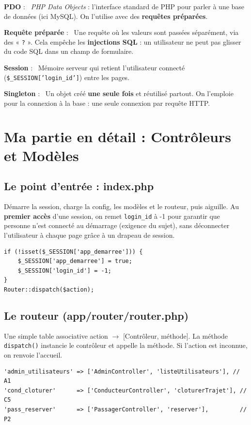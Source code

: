 \documentclass[11pt,a4paper]{article}
\newcommand{\motcle}[1]{\noindent\textbf{\color{bleu}#1} :\ }
\begin{document}
\motcle{PDO} \emph{PHP Data Objects} : l'interface standard de PHP pour parler à
une base de données (ici MySQL). On l'utilise avec des \textbf{requêtes
préparées}.

\motcle{Requête préparée} Une requête où les valeurs sont passées séparément, via
des « \texttt{?} ». Cela empêche les \textbf{injections SQL} : un utilisateur ne
peut pas glisser du code SQL dans un champ de formulaire.

\motcle{Session} Mémoire serveur qui retient l'utilisateur connecté
(\texttt{\$\_SESSION['login\_id']}) entre les pages.

\motcle{Singleton} Un objet créé \textbf{une seule fois} et réutilisé partout. On
l'emploie pour la connexion à la base : une seule connexion par requête HTTP.

\section{Ma partie en détail : Contrôleurs et Modèles}

\subsection{Le point d'entrée : index.php}
Démarre la session, charge la config, les modèles et le routeur, puis aiguille.
Au \textbf{premier accès} d'une session, on remet \texttt{login\_id} à -1 pour
garantir que personne n'est connecté au démarrage (exigence du sujet), sans
déconnecter l'utilisateur à chaque page grâce à un drapeau de session.
\begin{lstlisting}
if (!isset($_SESSION['app_demarree'])) {
    $_SESSION['app_demarree'] = true;
    $_SESSION['login_id'] = -1;
}
Router::dispatch($action);
\end{lstlisting}

\subsection{Le routeur (app/router/router.php)}
Une simple table associative action $\rightarrow$ [Contrôleur, méthode]. La
méthode \texttt{dispatch()} instancie le contrôleur et appelle la méthode. Si
l'action est inconnue, on renvoie l'accueil.
\begin{lstlisting}
'admin_utilisateurs' => ['AdminController', 'listeUtilisateurs'], // A1
'cond_cloturer'      => ['ConducteurController', 'cloturerTrajet'], // C5
'pass_reserver'      => ['PassagerController', 'reserver'],         // P2
\end{lstlisting}
\end{document}
